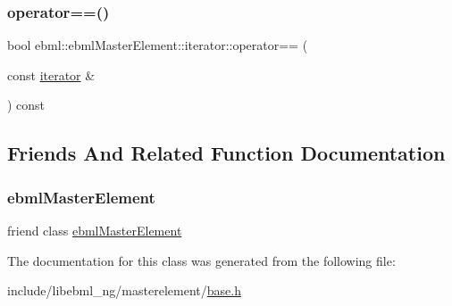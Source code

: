 \mbox{\label{classebml_1_1ebmlMasterElement_1_1iterator_afb3fe9d5db619b912eec528d2b2d71c5}} 
\subsubsection{\texorpdfstring{operator==()}{operator==()}}
{\footnotesize\ttfamily bool ebml\+::ebml\+Master\+Element\+::iterator\+::operator== (\begin{DoxyParamCaption}\item[{const \mbox{\hyperlink{classebml_1_1ebmlMasterElement_1_1iterator}{iterator}} \&}]{ }\end{DoxyParamCaption}) const}



\subsection{Friends And Related Function Documentation}
\mbox{\label{classebml_1_1ebmlMasterElement_1_1iterator_ad88e86cba72e9332a4693c1c6009b281}} 
\subsubsection{\texorpdfstring{ebml\+Master\+Element}{ebmlMasterElement}}
{\footnotesize\ttfamily friend class \mbox{\hyperlink{classebml_1_1ebmlMasterElement}{ebml\+Master\+Element}}\hspace{0.3cm}{\ttfamily [friend]}}



The documentation for this class was generated from the following file\+:\begin{DoxyCompactItemize}
\item 
include/libebml\+\_\+ng/masterelement/\mbox{\hyperlink{base_8h}{base.\+h}}\end{DoxyCompactItemize}
